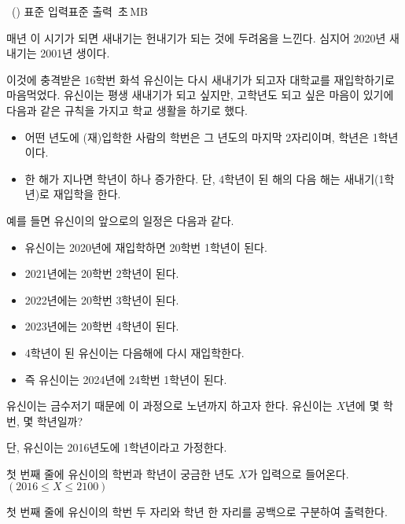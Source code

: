 \begin{problem}{\kcpcprobfirst\ (\kcpcprobfirstshort)}
    {표준 입력}{표준 출력}
    {\kcpcprobfirsttime\,초}{\kcpcprobfirstmemory\,MB}{}
    
    매년 이 시기가 되면 새내기는 헌내기가 되는 것에 두려움을 느낀다. 심지어 2020년 새내기는 2001년 생이다.
    
    이것에 충격받은 16학번 화석 유신이는 다시 새내기가 되고자 대학교를 재입학하기로 마음먹었다.
    유신이는 평생 새내기가 되고 싶지만, 고학년도 되고 싶은 마음이 있기에 다음과 같은 규칙을 가지고 학교 생활을 하기로 했다.
    
    \begin{itemize}
        \item 어떤 년도에 (재)입학한 사람의 학번은 그 년도의 마지막 2자리이며, 학년은 1학년이다.
        \item 한 해가 지나면 학년이 하나 증가한다. 단, 4학년이 된 해의 다음 해는 새내기(1학년)로 재입학을 한다.
    \end{itemize}
    
    예를 들면 유신이의 앞으로의 일정은 다음과 같다.
    
    \begin{itemize}
        \item 유신이는 2020년에 재입학하면 20학번 1학년이 된다.
        \item 2021년에는 20학번 2학년이 된다.
        \item 2022년에는 20학번 3학년이 된다.
        \item 2023년에는 20학번 4학년이 된다.
        \item 4학년이 된 유신이는 다음해에 다시 재입학한다.
        \item 즉 유신이는 2024년에 24학번 1학년이 된다.
    \end{itemize}
    
    유신이는 금수저기 때문에 이 과정으로 노년까지 하고자 한다.
    유신이는 $X$년에 몇 학번, 몇 학년일까?
    
    단, 유신이는 2016년도에 1학년이라고 가정한다.
    
    
    \InputFile
    첫 번째 줄에 유신이의 학번과 학년이 궁금한 년도 $X$가 입력으로 들어온다. $(2016 \leq X \leq 2100)$
    
    \OutputFile
    첫 번째 줄에 유신이의 학번 두 자리와 학년 한 자리를 공백으로 구분하여 출력한다.
    
    \Examples
    \begin{example}
    \end{example}

\end{problem}


